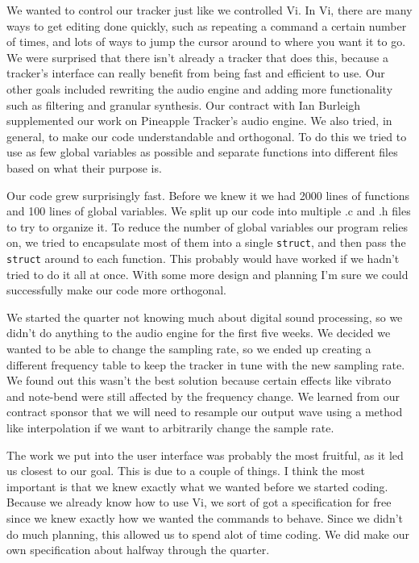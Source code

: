 \documentclass[12pt,letterpaper]{article}
\begin{document}
\par
We wanted to control our tracker just like we controlled Vi.
In Vi, there are many ways to get editing done quickly, such as repeating a command a certain number of times, and lots of ways to jump the cursor around to where you want it to go.
We were surprised that there isn't already a tracker that does this, because a tracker's interface can really benefit from being fast and efficient to use.
Our other goals included rewriting the audio engine and adding more functionality such as filtering and granular synthesis.
Our contract with Ian Burleigh supplemented our work on Pineapple Tracker's audio engine.
We also tried, in general, to make our code understandable and orthogonal.
To do this we tried to use as few global variables as possible and separate functions into different files based on what their purpose is.

\par
Our code grew surprisingly fast.
Before we knew it we had 2000 lines of functions and 100 lines of global variables.
We split up our code into multiple .c and .h files to try to organize it.
To reduce the number of global variables our program relies on, we tried to encapsulate most of them into a single {\tt struct}, and then pass the {\tt struct} around to each function.
This probably would have worked if we hadn't tried to do it all at once.
With some more design and planning I'm sure we could successfully make our code more orthogonal.

\par
We started the quarter not knowing much about digital sound processing, so we didn't do anything to the audio engine for the first five weeks.
We decided we wanted to be able to change the sampling rate, so we ended up creating a different frequency table to keep the tracker in tune with the new sampling rate.
We found out this wasn't the best solution because certain effects like vibrato and note-bend were still affected by the frequency change.
We learned from our contract sponsor that we will need to resample our output wave using a method like interpolation if we want to arbitrarily change the sample rate.


\par
The work we put into the user interface was probably the most fruitful, as it led us closest to our goal.
This is due to a couple of things.
I think the most important is that we knew exactly what we wanted before we started coding.
Because we already know how to use Vi, we sort of got a specification for free since we knew exactly how we wanted the commands to behave.
Since we didn't do much planning, this allowed us to spend alot of time coding.
We did make our own specification about halfway through the quarter.
\end{document}
